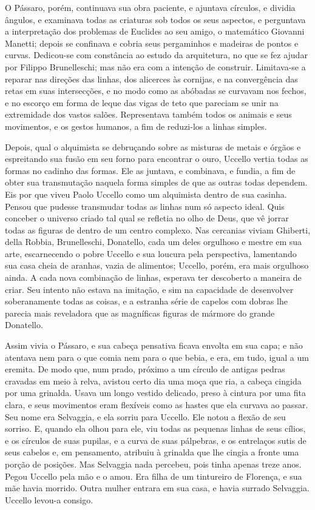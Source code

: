 O Pássaro, porém, continuava sua obra paciente, e ajuntava círculos, e
dividia ângulos, e examinava todas as criaturas sob todos os seus
aspectos, e perguntava a interpretação dos problemas de Euclides ao seu
amigo, o matemático Giovanni Manetti; depois se confinava e cobria seus
pergaminhos e madeiras de pontos e curvas. Dedicou-se com constância ao
estudo da arquitetura, no que se fez ajudar por Filippo Brunelleschi; mas
não era com a intenção de construir. Limitava-se a reparar nas direções
das linhas, dos alicerces às cornijas, e na convergência das retas em suas
intersecções, e no modo como as abóbadas se curvavam nos fechos, e no
escorço em forma de leque das vigas de teto que pareciam se unir na
extremidade dos vastos salões. Representava também todos os animais e seus
movimentos, e os gestos humanos, a fim de reduzi-los a linhas simples.

Depois, qual o alquimista se debruçando sobre as misturas de metais e
órgãos e espreitando sua fusão em seu forno para encontrar o ouro, Uccello
vertia todas as formas no cadinho das formas. Ele as juntava, e combinava,
e fundia, a fim de obter sua transmutação naquela forma simples de que as
outras todas dependem. Eis por que viveu Paolo Uccello como um alquimista
dentro de sua casinha. Pensou que pudesse transmudar todas as linhas num
só aspecto ideal. Quis conceber o universo criado tal qual se refletia no
olho de Deus, que vê jorrar todas as figuras de dentro de um centro
complexo. Nas cercanias viviam Ghiberti, della Robbia, Brunelleschi,
Donatello, cada um deles orgulhoso e mestre em sua arte, escarnecendo o
pobre Uccello e sua loucura pela perspectiva, lamentando sua casa cheia de
aranhas, vazia de alimentos; Uccello, porém, era mais orgulhoso ainda. A
cada nova combinação de linhas, esperava ter descoberto a maneira de
criar. Seu intento não estava na imitação, e sim na capacidade de \label{intento}
desenvolver soberanamente todas as coisas, e a estranha série de capelos
com dobras lhe parecia mais reveladora que as magníficas figuras de
mármore do grande Donatello.

Assim vivia o Pássaro, e sua cabeça pensativa ficava envolta em sua capa; e
não atentava nem para o que comia nem para o que bebia, e era, em tudo,
igual a um eremita. De modo que, num prado, próximo a um círculo de
antigas pedras cravadas em meio à relva, avistou certo dia uma moça que
ria, a cabeça cingida por uma grinalda. Usava um longo vestido delicado,
preso à cintura por uma fita clara, e seus movimentos eram flexíveis como
as hastes que ela curvava ao passar. Seu nome era Selvaggia, e ela sorriu
para Uccello. Ele notou a flexão de seu sorriso. E, quando ela olhou para
ele, viu todas as pequenas linhas de seus cílios, e os círculos de suas
pupilas, e a curva de suas pálpebras, e os entrelaços sutis de seus
cabelos e, em pensamento, atribuiu à grinalda que lhe cingia a fronte uma
porção de posições. Mas Selvaggia nada percebeu, pois tinha apenas treze
anos. Pegou Uccello pela mão e o amou. Era filha de um tintureiro de
Florença, e sua mãe havia morrido. Outra mulher entrara em sua casa, e
havia surrado Selvaggia. Uccello levou-a consigo.

